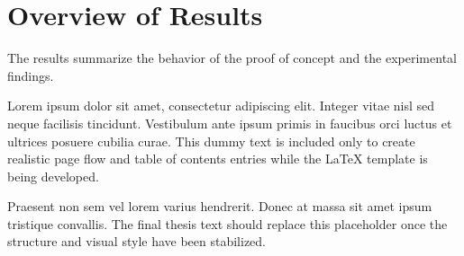 \section{Overview of Results}

The results summarize the behavior of the proof of concept and the experimental findings.

Lorem ipsum dolor sit amet, consectetur adipiscing elit. Integer vitae nisl sed neque facilisis tincidunt. Vestibulum ante ipsum primis in faucibus orci luctus et ultrices posuere cubilia curae. This dummy text is included only to create realistic page flow and table of contents entries while the LaTeX template is being developed.

Praesent non sem vel lorem varius hendrerit. Donec at massa sit amet ipsum tristique convallis. The final thesis text should replace this placeholder once the structure and visual style have been stabilized.

